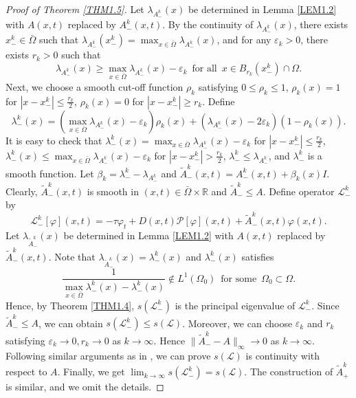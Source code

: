 \documentclass[11pt,reqno]{amsart}
\numberwithin{equation}{section}
\begin{document}
\begin{proof}[Proof of Theorem \ref{THM1.5}]
Let $\lambda_{A_{-}^{k}}(x)$ be determined in Lemma \ref{LEM1.2} with
$A(x,t)$ replaced by $A_{-}^{k}(x,t)$. By the continuity of $\lambda_{A_{-}^{k}}(x)$, there exists $x_{-}^{k} \in \bar{\Omega}$ such that
$\lambda_{A_{-}^{k}}(x_{-}^{k}) = \max_{x\in\bar{\Omega}} \lambda_{A_{-}^{k}}(x)$, and for any $\varepsilon_{k}>0$, there exists $r_{k}>0$ such that
\begin{equation*}
\lambda_{A_{-}^{k}}(x) \geq \max_{x\in\bar{\Omega}} \lambda_{A_{-}^{k}}(x) - \varepsilon_{k}
\enspace \text{for all} \enspace
x\in B_{r_{k}}(x_{-}^{k}) \cap \Omega.
\end{equation*}
Next, we choose a smooth cut-off function $\rho_{k}$ satisfying $0 \leq \rho_{k} \leq 1$, $\rho_{k}(x) = 1$ for $| x - x_{-}^{k} | \leq \frac{r_{k}}{2}$, $\rho_{k}(x) = 0$ for $| x - x_{-}^{k} | \geq r_{k} $.
Define
\begin{equation*}
\lambda_{-}^{k}(x) = \left( \max_{x\in\bar{\Omega}} \lambda_{A_{-}^{k}}(x) - \varepsilon_{k} \right)\rho_{k}(x) + \left( \lambda_{A_{-}^{k}}(x) - 2\varepsilon_{k} \right)\left( 1 - \rho_{k}(x) \right).
\end{equation*}
It is easy to check that $\lambda_{-}^{k}(x) = \max_{x\in\bar{\Omega}} \lambda_{A_{-}^{k}}(x) - \varepsilon_{k}$ for $ |x-x^{k}_{-}|\leq \frac{r_{k}}{2}$,
$\lambda_{-}^{k}(x) \leq \max_{x\in\bar{\Omega}} \lambda_{A_{-}^{k}}(x) - \varepsilon_{k}$ for $ |x-x^{k}_{-}| > \frac{r_{k}}{2}$,
$\lambda_{-}^{k} \leq \lambda_{A_{-}^{k}}$, and $\lambda_{-}^{k}$ is a smooth function.
Let $\beta_{k} = \lambda_{-}^{k} - \lambda_{A_{-}^{k}}$ and $\tilde{A}_{-}^{k}(x,t) = A_{-}^{k}(x,t) + \beta_{k}(x) I$.
Clearly, $\tilde{A}_{-}^{k}(x,t)$ is smooth in $(x,t)\in \bar{\Omega}\times \mathbb{R}$ and
$\tilde{A}_{-}^{k} \leq A$.
Define operator $\mathcal{L}_{-}^{k}$ by
\begin{equation*}
\mathcal{L}_{-}^{k}[\varphi](x,t) = -\tau\varphi_{t} + D(x,t)\mathcal{P}[\varphi](x,t) +  \tilde{A}_{-}^{k}(x,t)\varphi(x,t).
\end{equation*}
Let $\lambda_{\tilde{A}_{-}^{k}}(x)$ be determined in Lemma \ref{LEM1.2} with
$A(x,t)$ replaced by $\tilde{A}_{-}^{k}(x,t)$.
Note that $\lambda_{\tilde{A}_{-}^{k}}(x) =  \lambda_{-}^{k}(x)$ and $\lambda_{-}^{k}(x)$ satisfies
\begin{equation*}
\frac{1}{ \max_{x\in\bar{\Omega}}\lambda_{-}^{k}(x)- \lambda_{-}^{k}(x)}\not\in L^{1}(\Omega_{0})
\enspace\text{for some}\enspace \Omega_{0}\subset\Omega.
\end{equation*}
Hence, by Theorem \ref{THM1.4}, $s(\mathcal{L}_{-}^{k})$ is the principal eigenvalue of $\mathcal{L}_{-}^{k}$.
Since $\tilde{A}_{-}^{k} \leq A$, we can obtain   $s(\mathcal{L}_{-}^{k}) \leq s(\mathcal{L})$.
Moreover, we can choose $\varepsilon_{k}$ and $r_{k}$ satisfying $\varepsilon_{k} \to 0, r_{k}\to 0$ as $k\to\infty$. Hence $\| \tilde{A}_{-}^{k}  - A\|_{\infty} \to 0$ as $k\to\infty$.
Following similar arguments as in \cite[Theorem A.1]{ZL2}, we can prove $s(\mathcal{L})$ is continuity with respect to $A$.
Finally, we get $\lim_{k\to\infty} s(\mathcal{L}_{-}^{k}) = s(\mathcal{L})$.
The construction of $\tilde{A}_{+}^{k}$ is similar, and we omit the details.
\end{proof}
\end{document}
